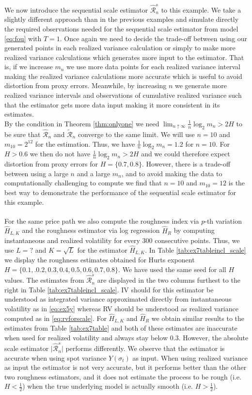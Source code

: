 \documentclass{article}
\begin{document}
We now introduce the sequential scale estimator $\widehat{\mathscr{R}}_n^s$ to this example. We take a slightly different approach than in the previous examples and simulate directly the required observations needed for the sequential scale estimator from model \eqref{eq:fou} with $T=1$. Once again we need to decide the trade-off between using our generated points in each realized variance calculation or simply to make more realized variance calculations which generates more input to the estimator. That is, if we increase $m_n$ we use more data points for each realized variance interval making the realized variance calculations more accurate which is useful to avoid distortion from proxy errors. Meanwhile, by increasing $n$ we generate more realized variance intervals and observations of cumulative realized variance such that the estimator gets more data input making it more consistent in its estimates.\\
By the condition in Theorem \ref{thm:onlyone} we need $\lim_{n\uparrow \infty} \frac{1}{n}\log_2 m_n >2H$ to be sure that $\widehat{\mathscr{R}}_n$ and $\widetilde{\mathscr{R}}_n$ converge to the same limit. We will use $n=10$ and $m_{10} = 2^{12}$ for the estimation. Thus, we have $\frac{1}{n}\log_2 m_n=1.2$ for $n=10$. For $H>0.6$ we then do not have $\frac{1}{n}\log_2 m_n >2H$ and we could therefore expect distortion from proxy errors for $H=\{0.7,0.8\}$. However, there is a trade-off between using a large $n$ and a large $m_n$, and to avoid making the data to computationally challenging to compute we find that $n=10$ and $m_{10}=12$ is the best way to demonstrate the performance of the sequential scale estimator for this example.\\\\
For the same price path we also compute the roughness index via $p$-th variation $\widehat{H}_{L,K}$ and the roughness estimator via log regression $\widehat{H}_R$ by computing instantaneous and realized volatility for every 300 consecutive points. Thus, we use $L=?$ and $K=\sqrt{L}$ for the estimator $\hat{H}_{L,K}$. In Table \ref{tab:ex7tableincl_scale} we display the roughness estimates obtained for Hurts exponent $H=\{0.1,.0.2,0.3,0.4,0.5,0.6,0.7,0.8\}$. We have used the same seed for all $H$ values. The estimates from $\widehat{\mathscr{R}}_n^s$ are displayed in the two columns furthest to the right in Table \ref{tab:ex7tableincl_scale}. IV should for this estimator be understood as integrated variance approximated directly from instantaneous volatility as in \eqref{eq:ex5y} whereas RV should be understood as realized variance computed as in \eqref{eq:rvforscale}. For $\widehat{H}_{L,K}$ and $\widehat{H}_{R}$ we obtain similar results to the estimates from Table \ref{tab:ex7table} and both of these estimates are inaccurate when used for realized volatility and always stay below 0.3. However, the absolute scale estimator $\lvert \widehat{\mathscr{R}}_n^s\rvert$ performs differently. We observe that the estimator is accurate when using spot variance $Y(\sigma_t)$ as input. When using realized variance as input the estimator is not very accurate, but it performs better than the other two roughness estimators, and it does not estimate the process to be rough (i.e. $H<\frac{1}{2}$) when the true underlying model is actually smooth (i.e. $H>\frac{1}{2}$).
\end{document}
